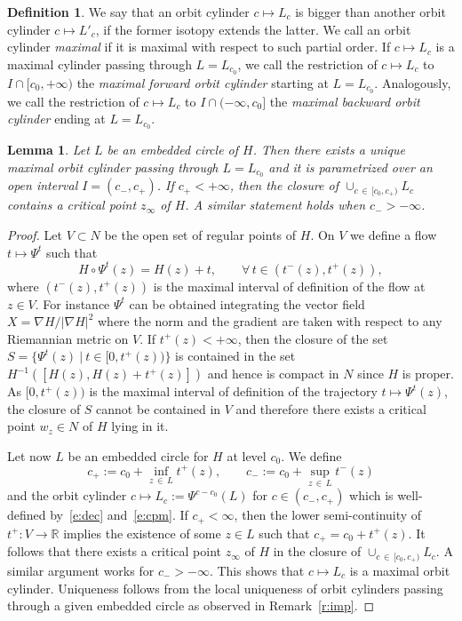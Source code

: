 \documentclass[10pt]{amsart}
\newtheorem{lemm}[cdrthm]{Lemma}
\theoremstyle{definition}
\newtheorem{defi}[cdrthm]{Definition}
\newcommand{\R}{\mathbb{R}}
\let\oldforall\forall
\renewcommand*{\forall}{\mathrel{\oldforall}}
\begin{document}
\begin{defi}
We say that an orbit cylinder $c\mapsto L_c$ is bigger than another orbit cylinder $c\mapsto L'_c$, if the former isotopy extends the latter. We call an orbit cylinder \emph{maximal} if it is maximal with respect to such partial order. If $c\mapsto L_c$ is a maximal cylinder passing through $L=L_{c_0}$, we call the restriction of $c\mapsto L_c$ to $I\cap[c_0,+\infty)$ the \emph{maximal forward orbit cylinder} starting at $L=L_{c_0}$. Analogously, we call the restriction of $c\mapsto L_c$ to $I\cap(-\infty,c_0]$ the \emph{maximal backward orbit cylinder} ending at $L=L_{c_0}$.
\end{defi}

\begin{lemm}\label{l:emb}
Let $L$ be an embedded circle of $H$. Then there exists a unique maximal orbit cylinder passing through $L=L_{c_0}$ and it is parametrized over an open interval $I=(c_-,c_+)$. If $c_+<+\infty$, then the closure of $\cup_{c\,\in\,[c_0,c_+)}L_c$ contains a critical point $z_\infty$ of $H$. A similar statement holds when $c_->-\infty$.
\end{lemm}

\begin{proof}
Let $V\subset N$ be the open set of regular points of $H$. On $V$ we define a flow $t\mapsto\Psi^t$ such that
\begin{equation}\label{e:dec}
H\circ\Psi^t(z)=H(z)+t,\qquad \forall\,t\in\left(t^-(z),t^+(z)\right),
\end{equation}
where $(t^-(z),t^+(z))$ is the maximal interval of definition of the flow at $z\in V$. For instance $\Psi^t$ can be obtained integrating the vector field $X=\nabla H/|\nabla H|^2$ where the norm and the gradient are taken with respect to any Riemannian metric on $V$. If $t^+(z)<+\infty$, then the closure of the set $S=\{\Psi^t(z)\ |\ t\in[0,t^+(z))\}$ is contained in the set $H^{-1}([H(z),H(z)+t^+(z)])$ and hence is compact in $N$ since $H$ is proper. As $[0,t^+(z))$ is the maximal interval of definition of the trajectory $t\mapsto\Psi^t(z)$, the closure of $S$ cannot be contained in $V$ and therefore there exists a critical point $w_z\in N$ of $H$ lying in it.

Let now $L$ be an embedded circle for $H$ at level $c_0$. We define
\begin{equation}\label{e:cpm}
c_+:=c_0+\inf_{z\,\in\,L}t^+(z),\qquad c_-:=c_0+\sup_{z\,\in\,L}t^-(z)
\end{equation}
and the orbit cylinder $c\mapsto L_c:=\Psi^{c-c_0}(L)$ for $c\in(c_-,c_+)$ which is well-defined by~\eqref{e:dec} and~\eqref{e:cpm}. If $c_+<\infty$, then the lower semi-continuity of $t^+:V\to\R$ implies the existence of some $z\in L$ such that $c_+=c_0+t^+(z)$. It follows that there exists a critical point $z_\infty$ of $H$ in the closure of $\cup_{c\,\in\,[c_0,c_+)}L_c$. A similar argument works for $c_->-\infty$. This shows that $c\mapsto L_c$ is a maximal orbit cylinder. Uniqueness follows from the local uniqueness of orbit cylinders passing through a given embedded circle as observed in Remark~\ref{r:imp}.
\end{proof}
\end{document}
